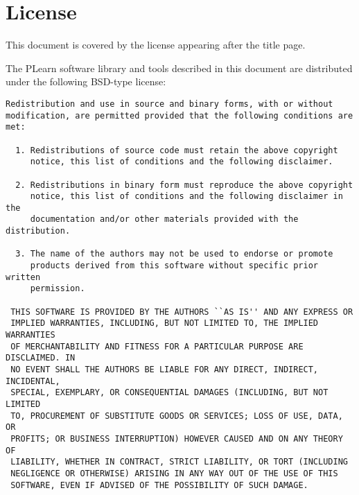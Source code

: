 \documentclass[11pt]{book}
\begin{document}
\chapter*{License}

This document is covered by the license appearing after the title page.

\vspace*{.5cm}

The PLearn software library and tools described in this document are
distributed under the following BSD-type license:

\begin{verbatim}
Redistribution and use in source and binary forms, with or without
modification, are permitted provided that the following conditions are met:
 
  1. Redistributions of source code must retain the above copyright
     notice, this list of conditions and the following disclaimer.
 
  2. Redistributions in binary form must reproduce the above copyright
     notice, this list of conditions and the following disclaimer in the
     documentation and/or other materials provided with the distribution.
 
  3. The name of the authors may not be used to endorse or promote
     products derived from this software without specific prior written
     permission.
 
 THIS SOFTWARE IS PROVIDED BY THE AUTHORS ``AS IS'' AND ANY EXPRESS OR
 IMPLIED WARRANTIES, INCLUDING, BUT NOT LIMITED TO, THE IMPLIED WARRANTIES
 OF MERCHANTABILITY AND FITNESS FOR A PARTICULAR PURPOSE ARE DISCLAIMED. IN
 NO EVENT SHALL THE AUTHORS BE LIABLE FOR ANY DIRECT, INDIRECT, INCIDENTAL,
 SPECIAL, EXEMPLARY, OR CONSEQUENTIAL DAMAGES (INCLUDING, BUT NOT LIMITED
 TO, PROCUREMENT OF SUBSTITUTE GOODS OR SERVICES; LOSS OF USE, DATA, OR
 PROFITS; OR BUSINESS INTERRUPTION) HOWEVER CAUSED AND ON ANY THEORY OF
 LIABILITY, WHETHER IN CONTRACT, STRICT LIABILITY, OR TORT (INCLUDING
 NEGLIGENCE OR OTHERWISE) ARISING IN ANY WAY OUT OF THE USE OF THIS
 SOFTWARE, EVEN IF ADVISED OF THE POSSIBILITY OF SUCH DAMAGE.
\end{verbatim}
\end{document}
